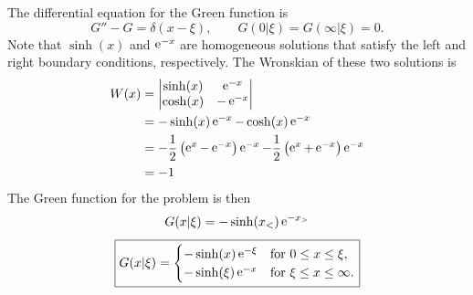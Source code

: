 {%
\begin{Solution}
  \label{solution y-y=f y0=yinf=0}
  The differential equation for the Green function is
  \[
  G'' - G = \delta(x - \xi), \qquad G(0|\xi) = G(\infty|\xi) = 0.
  \]
  Note that $\sinh(x)$ and $\mathop{\mathrm{e}}\nolimits^{-x}$ are homogeneous solutions that satisfy
  the left and right boundary conditions, respectively.  The Wronskian of 
  these two solutions is
  \begin{align*}
    W(x)    &= \begin{vmatrix} \sinh(x) & \mathop{\mathrm{e}}\nolimits^{-x} \\ \cosh(x) & - \mathop{\mathrm{e}}\nolimits^{-x}
    \end{vmatrix} \\
    &= - \sinh(x) \mathop{\mathrm{e}}\nolimits^{-x} - \cosh(x) \mathop{\mathrm{e}}\nolimits^{-x} \\
    &= - \frac{1}{2} \left( \mathop{\mathrm{e}}\nolimits^x - \mathop{\mathrm{e}}\nolimits^{-x} \right) \mathop{\mathrm{e}}\nolimits^{-x}
    - \frac{1}{2} \left( \mathop{\mathrm{e}}\nolimits^x + \mathop{\mathrm{e}}\nolimits^{-x} \right) \mathop{\mathrm{e}}\nolimits^{-x} \\
    &= -1
  \end{align*}
  The Green function for the problem is then
  \[
  G(x|\xi) = - \sinh(x_<) \mathop{\mathrm{e}}\nolimits^{-x_>}
  \]
  \[
  \boxed{
    G(x|\xi) = \begin{cases}
      - \sinh(x) \mathop{\mathrm{e}}\nolimits^{-\xi} &\mathrm{for}\ 0 \leq x \leq \xi, \\
      - \sinh(\xi) \mathop{\mathrm{e}}\nolimits^{-x} &\mathrm{for}\ \xi \leq x \leq \infty. \\
    \end{cases}
    }
  \]
\end{Solution}







\begin{Solution}
  \label{solution xu+u=f}

  $\phantom{a}$  %


\end{Solution}}
